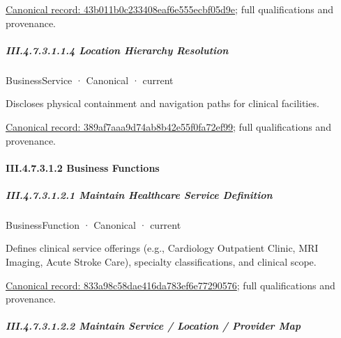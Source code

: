 {\footnotesize \href{../../../../continuum/business/business-service/43b011b0c233408eaf6e555ecbf05d9e.md}{Canonical record: 43b011b0c233408eaf6e555ecbf05d9e}; full qualifications and provenance.}\par
\subparagraph*{III.4.7.3.1.1.4 Location Hierarchy Resolution}
\label{navigation:III.4.7.3.1.1.4}

\label{element:389af7aaa9d74ab8b42e55f0fa72ef99}
{\small BusinessService · Canonical · current}\par

Discloses physical containment and navigation paths for clinical facilities.


{\footnotesize \href{../../../../continuum/business/business-service/389af7aaa9d74ab8b42e55f0fa72ef99.md}{Canonical record: 389af7aaa9d74ab8b42e55f0fa72ef99}; full qualifications and provenance.}\par
\paragraph*{III.4.7.3.1.2 Business Functions}
\label{navigation:III.4.7.3.1.2}

\subparagraph*{III.4.7.3.1.2.1 Maintain Healthcare Service Definition}
\label{navigation:III.4.7.3.1.2.1}

\label{element:833a98c58dae416da783ef6e77290576}
{\small BusinessFunction · Canonical · current}\par

Defines clinical service offerings (e.g., Cardiology Outpatient Clinic, MRI Imaging, Acute Stroke Care), specialty classifications, and clinical scope.


{\footnotesize \href{../../../../continuum/business/business-function/833a98c58dae416da783ef6e77290576.md}{Canonical record: 833a98c58dae416da783ef6e77290576}; full qualifications and provenance.}\par
\subparagraph*{III.4.7.3.1.2.2 Maintain Service / Location / Provider Map}
\label{navigation:III.4.7.3.1.2.2}

